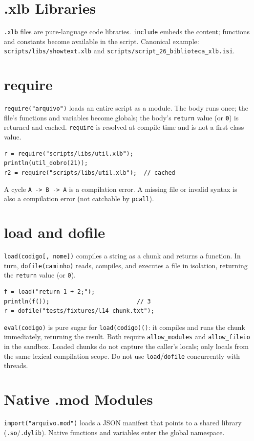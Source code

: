\documentclass[11pt,a4paper,oneside]{report}
\newcommand{\code}[1]{\texttt{#1}}
\newcommand{\file}[1]{\texttt{#1}}
\begin{document}
\section{.xlb Libraries}
\code{.xlb} files are pure-language code libraries. \code{include}
embeds the content; functions and constants become available in the
script. Canonical example: \file{scripts/libs/showtext.xlb} and
\file{scripts/script\_26\_biblioteca\_xlb.isi}.

\section{require}
\code{require("arquivo")} loads an entire script as a module. The body
runs once; the file's functions and variables become globals; the body's
\code{return} value (or \code{0}) is returned and cached. \code{require}
is resolved at compile time and is not a first-class value.

\begin{lstlisting}
r = require("scripts/libs/util.xlb");
println(util_dobro(21));
r2 = require("scripts/libs/util.xlb");  // cached
\end{lstlisting}

A cycle \code{A -> B -> A} is a compilation error. A missing file or
invalid syntax is also a compilation error (not catchable by
\code{pcall}).

\section{load and dofile}
\code{load(codigo[, nome])} compiles a string as a chunk and returns a
function. In turn, \code{dofile(caminho)} reads, compiles, and executes a
file in isolation, returning the \code{return} value (or \code{0}).

\begin{lstlisting}
f = load("return 1 + 2;");
println(f());                         // 3
r = dofile("tests/fixtures/l14_chunk.txt");
\end{lstlisting}

\code{eval(codigo)} is pure sugar for \code{load(codigo)()}: it compiles
and runs the chunk immediately, returning the result. Both require
\code{allow\_modules} and \code{allow\_fileio} in the sandbox.
Loaded chunks do not capture the caller's locals; only locals from the
same lexical compilation scope. Do not use \code{load}/\code{dofile}
concurrently with threads.

\section{Native .mod Modules}
\code{import("arquivo.mod")} loads a JSON manifest that points to a
shared library (\code{.so}/\code{.dylib}). Native functions and variables
enter the global namespace.
\end{document}
